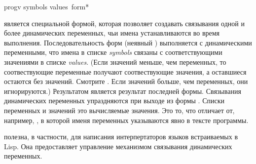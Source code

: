 \begin{defspec}
progv symbols values {\,form}*

 является специальной формой, которая позволяет создавать связывания
одной и более динамических переменных, чьи имена устанавливаются во время
выполнения. Последовательность форм (неявный )
выполняется с динамическими переменными, что имена в списке \emph{symbols}
связаны с соответствующими значениями в списке \emph{values}.
(Если значений меньше, чем переменных, то соотвествующие переменные получают
соотвествующие значения, а оставшиеся остаются без значений. Смотрите
. Если значений больше, чем переменных, они игнорируются.)
Результатом  является результат последней формы. Связывания
динамических переменных упраздняются при выходе из формы . Списки
переменных и значений это вычисляемые значения. Это то, что отличает 
от, например, , в которой именя переменных указываются явно в тексте
программы.

 полезна, в частности, для написания интерпертаторов языков
встраиваемых в Lisp. Она предоставляет управление механизмом связывания
динамических переменных.
\end{defspec}


